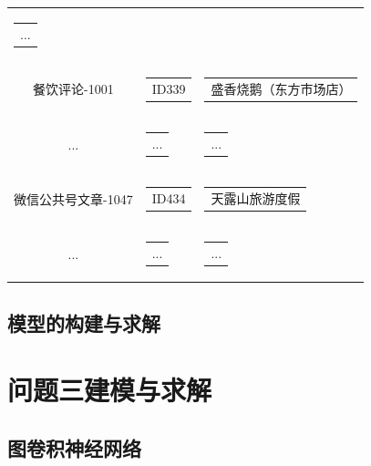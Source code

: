 \documentclass[bwprint]{gmcmthesis}
\begin{document}
\begin{center}
\begin{longtable}{c|c|c}
\begin{tabular}[c]{@{}l@{}}
              ...
            \end{tabular} \\
            餐饮评论-1001 & \begin{tabular}[c]{@{}c@{}}
              ID339
              \end{tabular} 
              & \begin{tabular}[c]{@{}l@{}}
                盛香烧鹅（东方市场店）
              \end{tabular} \\
              ... & \begin{tabular}[c]{@{}c@{}}
                ...
              \end{tabular} 
              & \begin{tabular}[c]{@{}l@{}}
                ...
              \end{tabular} \\
              微信公共号文章-1047 & \begin{tabular}[c]{@{}c@{}}
                ID434
                \end{tabular} 
                & \begin{tabular}[c]{@{}l@{}}
                  天露山旅游度假
                \end{tabular} \\
                ... & \begin{tabular}[c]{@{}c@{}}
                  ...
                \end{tabular} 
                & \begin{tabular}[c]{@{}l@{}}
                  ...
                \end{tabular} \\
      \hline
  \end{longtable}
  \end{center}

\subsection{模型的构建与求解}

\section{问题三建模与求解}

\subsection{图卷积神经网络}
\end{document}
